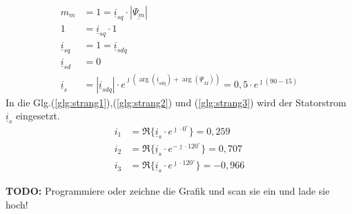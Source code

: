 \begin{solution}
\begin{compactenum}
\begin{align}
m_m &= 1 = \underline{i}_{sq} \cdot |\underline{\Psi_m}|\\
1 &= \underline{i}_{sq} \cdot 1\\
\underline{i}_{sq} &= 1 = \underline{i}_{sdq} \\
\underline{i}_{sd} &= 0\\
\underline{i}_{s} &= |\underline{i}_{sdq}| \cdot e^{\jmath (\arg(\underline{i}_{sdq}) + \arg(\underline{\Psi}_{M}))}= 0,5 \cdot e^{\jmath (90 - 15)}
\end{align}
In die Glg.(\ref{glg:strang1}),(\ref{glg:strang2}) und (\ref{glg:strang3}) wird der Statorstrom $\underline{i}_s$ eingesetzt.
\begin{align}
i_1 & = \Re \{ \underline{i}_s \cdot e^{\jmath \cdot 0 ^\circ} \} = 0,259\\
i_2 & = \Re \{ \underline{i}_s \cdot e^{-\jmath \cdot 120 ^\circ} \} = 0,707 \\
i_3 & = \Re \{ \underline{i}_s \cdot e^{\jmath \cdot 120 ^\circ} \}=  -0,966
\end{align}
\item \textbf{TODO:} Programmiere oder zeichne die Grafik und scan sie ein und lade sie hoch!
\end{compactenum}
\end{solution}